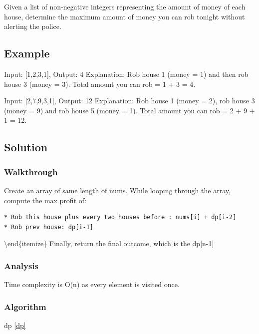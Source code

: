 \documentclass[]{book}
\begin{document}
Given a list of non-negative integers representing the amount of money of each house, determine the maximum amount of
money you can rob tonight without alerting the police.

\hypertarget{example-32}{%
\subsection{Example}\label{example-32}}

Input: {[}1,2,3,1{]}, Output: 4
Explanation: Rob house 1 (money = 1) and then rob house 3 (money = 3).
Total amount you can rob = 1 + 3 = 4.

Input: {[}2,7,9,3,1{]}, Output: 12
Explanation: Rob house 1 (money = 2), rob house 3 (money = 9) and rob house 5 (money = 1).
Total amount you can rob = 2 + 9 + 1 = 12.

\hypertarget{solution-26}{%
\subsection{Solution}\label{solution-26}}

\hypertarget{walkthrough-32}{%
\subsubsection{Walkthrough}\label{walkthrough-32}}

Create an array of same length of nums. While looping through the array, compute the max profit of:

\begin{verbatim}
* Rob this house plus every two houses before : nums[i] + dp[i-2]
* Rob prev house: dp[i-1]
\end{verbatim}

\textbackslash{}end\{itemize\}
Finally, return the final outcome, which is the dp{[}n-1{]}

\hypertarget{analysis-35}{%
\subsubsection{Analysis}\label{analysis-35}}

Time complexity is O(n) as every element is visited once.

\hypertarget{algorithm-35}{%
\subsubsection{Algorithm}\label{algorithm-35}}

dp \ref{dp}
\end{document}
